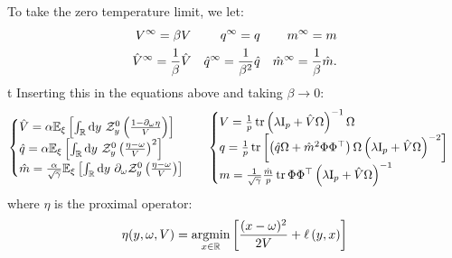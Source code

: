 \documentclass[11pt]{article}
\numberwithin{equation}{section}
\begin{document}
To take the zero temperature limit, we let:
\begin{align}
V^{\infty}=\beta V && q^{\infty}= q && m^{\infty}= m\notag\\
\hat{V}^{\infty}=\frac{1}{\beta} \hat{V} && \hat{q}^{\infty} = \frac{1}{\beta^2}\hat{q} && \hat{m}^{\infty} = \frac{1}{\beta}\hat{m}.
\end{align}t
Inserting this in the equations above and taking $\beta\to 0$:
\begin{align}
	\begin{cases}
		\hat{V} = \alpha\mathbb{E}_{\xi}\left[\int_{\mathbb{R}}\text{d} y~\mathcal{Z}^{0}_{y} \left(\frac{1-\partial_{\omega}\eta}{V}\right)\right]\\
		\hat{q} = \alpha \mathbb{E}_{\xi}\left[\int_{\mathbb{R}}\text{d} y~\mathcal{Z}^{0}_{y} \left( \frac{\eta	-\omega}{V}\right)^2 \right]\\
		\hat{m} = \frac{\alpha}{\sqrt{\gamma}} \mathbb{E}_{\xi}\left[\int_{\mathbb{R}}\text{d} y~\partial_{\omega}\mathcal{Z}^{0}_{y}\left(\frac{\eta-\omega}{V}\right) \right]
	\end{cases} && 
	\begin{cases}
		V =  \frac{1}{p}\tr\left(\lambda\text{I}_{p}+\hat{V}\Omega\right)^{-1}\Omega\\
		q = \frac{1}{p}\tr\left[\left(\hat{q}\Omega+\hat{m}^{2}\Phi\Phi^{\top}\right)\Omega\left(\lambda\text{I}_{p}+\hat{V}\Omega\right)^{-2}\right]\\
		m= \frac{1}{\sqrt{\gamma}}\frac{\hat{m}}{p}\tr \Phi\Phi^{\top}\left(\lambda\text{I}_{p}+\hat{V}\Omega\right)^{-1}
	\end{cases}
\end{align}
\noindent where $\eta$ is the proximal operator:
\begin{align}
\eta(y,\omega,V) = \underset{x\in\mathbb{R}}{\textrm{argmin}}\left[\frac{(x-\omega)^2}{2V}+\ell\left(y, x\right)\right]
\end{align}
\end{document}
